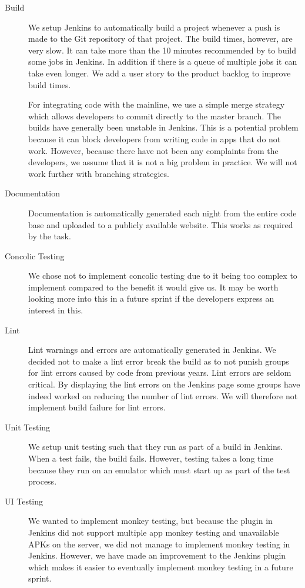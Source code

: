 \begin{description}
  \item[Build] We setup Jenkins to automatically build a project whenever a push is made to the Git repository of that project. The build times, however, are very slow. It can take more than the 10 minutes recommended by \textcite{beck2004} to build some jobs in Jenkins. In addition if there is a queue of multiple jobs it can take even longer. We add a user story to the product backlog to improve build times.

  For integrating code with the mainline, we use a simple merge strategy which allows developers to commit directly to the master branch. The builds have generally been unstable in Jenkins. This is a potential problem because it can block developers from writing code in apps that do not work. However, because there have not been any complaints from the developers, we assume that it is not a big problem in practice. We will not work further with branching strategies.
  \item[Documentation] Documentation is automatically generated each night from the entire code base and uploaded to a publicly available website. This works as required by the task.
  \item[Concolic Testing] We chose not to implement concolic testing due to it being too complex to implement compared to the benefit it would give us. It may be worth looking more into this in a future sprint if the developers express an interest in this.
  \item[Lint] Lint warnings and errors are automatically generated in Jenkins. We decided not to make a lint error break the build as to not punish groups for lint errors caused by code from previous years. Lint errors are seldom critical. By displaying the lint errors on the Jenkins page some groups have indeed worked on reducing the number of lint errors. We will therefore not implement build failure for lint errors.
  \item[Unit Testing] We setup unit testing such that they run as part of a build in Jenkins. When a test fails, the build fails. However, testing takes a long time because they run on an emulator which must start up as part of the test process.
  \item[UI Testing] We wanted to implement monkey testing, but because the plugin in Jenkins did not support multiple app monkey testing and unavailable APKs on the server, we did not manage to implement monkey testing in Jenkins. However, we have made an improvement to the Jenkins plugin which makes it easier to eventually implement monkey testing in a future sprint.
\end{description}

